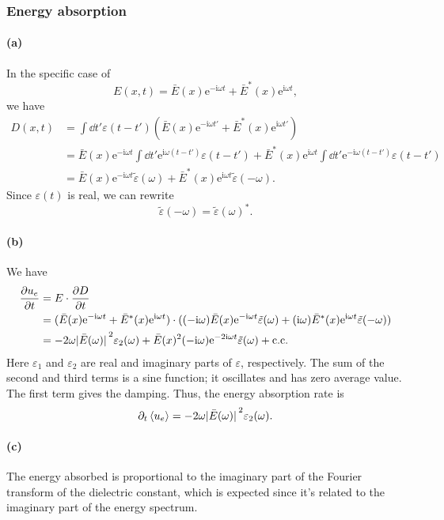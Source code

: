 \documentclass[hyperref, a4paper]{article}
\newcommand*{\ii}{\mathrm{i}}
\newcommand*{\ee}{\mathrm{e}}
\begin{document}
\subsubsection{Energy absorption}\label{sec:absorption}

\paragraph{(a)} In the specific case of 
\begin{equation}
    E(x, t) = \bar{E}(x) \ee^{- \ii \omega t} + \bar{E}^*(x) \ee^{\ii \omega t},
\end{equation}
we have 
\begin{equation}
    \begin{aligned}
        D(x, t) &= \int \dd{t'} \varepsilon(t - t') (
            \bar{E}(x) \ee^{- \ii \omega t'} + \bar{E}^*(x) \ee^{\ii \omega t'}
        ) \\
        &= \bar{E}(x) \ee^{- \ii \omega t} \int \dd{t'} 
        \ee^{\ii \omega (t - t')} \varepsilon(t - t') 
        + \bar{E}^*(x) \ee^{\ii \omega t} \int \dd{t'} 
        \ee^{- \ii \omega (t - t')} \varepsilon(t - t' ) \\
        &= \bar{E}(x) \ee^{- \ii \omega t} \tilde{\varepsilon}(\omega)
        + \bar{E}^*(x) \ee^{\ii \omega t} \tilde{\varepsilon}(- \omega).
    \end{aligned}
\end{equation}
Since $\varepsilon(t)$ is real, we can rewrite 
\begin{equation}
    \tilde{\varepsilon}(- \omega) = \tilde{\varepsilon}(\omega)^*.
\end{equation}

\paragraph{(b)} We have 
\begin{equation}
    \begin{aligned}
        \pdv{u_e}{t} &= E \cdot \pdv{D}{t} \\
        &= (
            \bar{E}(x) \ee^{- \ii \omega t} + \bar{E}^*(x) \ee^{\ii \omega t}
        ) \cdot (
            (- \ii \omega) \bar{E}(x) \ee^{- \ii \omega t} \tilde{\varepsilon}(\omega)
            + (\ii \omega) \bar{E}^*(x) \ee^{\ii \omega t} \tilde{\varepsilon}(- \omega)
        ) \\
        &= - 2 \omega \abs*{\bar{E}(\omega)}^2 \varepsilon_2(\omega)
        + \bar{E}(x)^2 (- \ii \omega) \ee^{- 2 \ii \omega t} \tilde{\varepsilon}(\omega)
        + \text{c.c.}
    \end{aligned}
    \label{eq:ue-change}
\end{equation}
Here $\varepsilon_1$ and $\varepsilon_2$ 
are real and imaginary parts of $\varepsilon$, respectively.
The sum of the second and third terms is a sine function; 
it oscillates and has zero average value.
The first term gives the damping.
Thus, the energy absorption rate is 
\begin{equation}
    \partial_t \expval{u_e} = - 2 \omega \abs*{\bar{E}(\omega)}^2 \varepsilon_2(\omega).
\end{equation}

\paragraph{(c)} The energy absorbed is proportional to the imaginary part 
of the Fourier transform of the dielectric constant, 
which is expected since it's related to the imaginary part of the energy spectrum.
\end{document}
